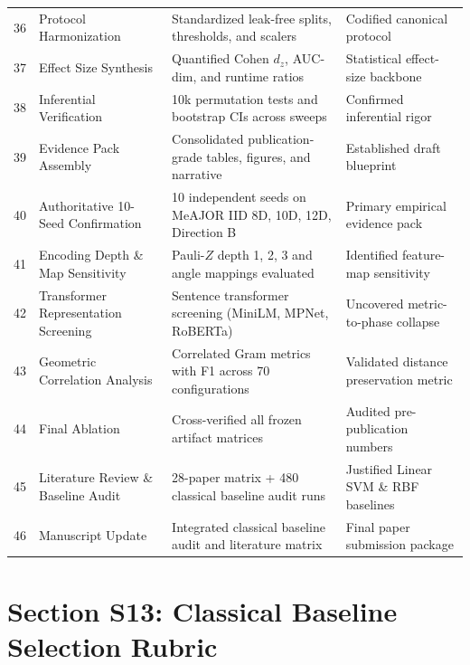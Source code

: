 \documentclass[10pt,letterpaper]{article}
\begin{document}
\begin{table}[h!]
\begin{tabular}{clll}
36 & Protocol Harmonization & Standardized leak-free splits, thresholds, and scalers & Codified canonical protocol \\
37 & Effect Size Synthesis & Quantified Cohen $d_z$, AUC-dim, and runtime ratios & Statistical effect-size backbone \\
38 & Inferential Verification & 10k permutation tests and bootstrap CIs across sweeps & Confirmed inferential rigor \\
39 & Evidence Pack Assembly & Consolidated publication-grade tables, figures, and narrative & Established draft blueprint \\
40 & Authoritative 10-Seed Confirmation & 10 independent seeds on MeAJOR IID 8D, 10D, 12D, Direction B & Primary empirical evidence pack \\
41 & Encoding Depth \& Map Sensitivity & Pauli-$Z$ depth 1, 2, 3 and angle mappings evaluated & Identified feature-map sensitivity \\
42 & Transformer Representation Screening & Sentence transformer screening (MiniLM, MPNet, RoBERTa) & Uncovered metric-to-phase collapse \\
43 & Geometric Correlation Analysis & Correlated Gram metrics with F1 across 70 configurations & Validated distance preservation metric \\
44 & Final Ablation & Cross-verified all frozen artifact matrices & Audited pre-publication numbers \\
45 & Literature Review \& Baseline Audit & 28-paper matrix + 480 classical baseline audit runs & Justified Linear SVM \& RBF baselines \\
46 & Manuscript Update & Integrated classical baseline audit and literature matrix & Final paper submission package \\
\bottomrule
\end{tabular}
\end{table}

\section{Section S13: Classical Baseline Selection Rubric}
\label{sec:supp_selection_rubric}
\end{document}
